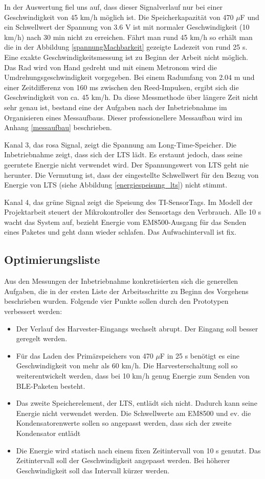 In der Auswertung fiel uns auf, dass dieser Signalverlauf nur bei einer Geschwindigkeit von 45 km/h möglich ist. Die Speicherkapazität von 470 $\mu$F und ein Schwellwert der Spannung von 3.6 V ist mit normaler Geschwindigkeit (10 km/h) nach 30 min nicht zu erreichen. Fährt man rund 45 km/h so erhält man die in der Abbildung \ref{spannungMachbarkeit} gezeigte Ladezeit von rund 25 s. Eine exakte Geschwindigkeitsmessung ist zu Beginn der Arbeit nicht möglich. Das Rad wird von Hand gedreht und mit einem Metronom wird die Umdrehungsgeschwindigkeit vorgegeben. Bei einem Radumfang von 2.04 m und einer Zeitdifferenz von 160 ms zwischen den Reed-Impulsen, ergibt sich die Geschwindigkeit von ca. 45 km/h. Da diese Messmethode über längere Zeit nicht sehr genau ist, bestand eine der Aufgaben nach der Inbetriebnahme im Organisieren eines Messaufbaus. Dieser professionellere Messaufbau wird im Anhang \ref{messaufbau} beschrieben.

Kanal 3, das rosa Signal, zeigt die Spannung am Long-Time-Speicher. Die Inbetriebnahme zeigt, dass sich der LTS lädt. Es erstaunt jedoch, dass seine geerntete Energie nicht verwendet wird. Der Spannungswert von LTS geht nie herunter.
Die Vermutung ist, dass der eingestellte Schwellwert für den Bezug von Energie von LTS (siehe Abbildung \ref{energiespeisung_lts}) nicht stimmt.

Kanal 4, das grüne Signal zeigt die Speisung des TI-SensorTags. Im Modell der Projektarbeit steuert der Mikrokontroller des Sensortags den Verbrauch. Alle 10 s wacht das System auf, bezieht Energie vom EM8500-Ausgang für das Senden eines Paketes und geht dann wieder schlafen. Das Aufwachintervall ist fix.


\subsection{Optimierungsliste}\label{optimierung} 

Aus den Messungen der Inbetriebnahme konkretisierten sich die generellen Aufgaben, die in der ersten Liste der Arbeitsschritte zu Beginn des Vorgehens  beschrieben wurden. Folgende vier Punkte sollen durch den Prototypen verbessert werden: 

\begin{itemize}
     \item Der Verlauf des Harvester-Eingangs wechselt abrupt. Der Eingang soll besser geregelt werden. 
     \item Für das Laden des Primärspeichers von 470 $\mu$F in 25 s benötigt es eine Geschwindigkeit von mehr als 60 km/h.  Die Harvesterschaltung soll so weiterentwickelt werden, dass bei 10 km/h genug Energie zum Senden von BLE-Paketen besteht.    
     \item Das zweite Speicherelement, der LTS, entlädt sich nicht. Dadurch kann seine Energie nicht verwendet werden. Die Schwellwerte am EM8500 und ev. die Kondensatorenwerte sollen so angepasst werden, dass sich der zweite Kondensator entlädt
     \item Die Energie wird statisch nach einem fixen Zeitintervall von 10 s genutzt. Das Zeitintervall soll der Geschwindigkeit angepasst werden. Bei höherer Geschwindigkeit soll das Intervall kürzer werden.
\end{itemize} 


